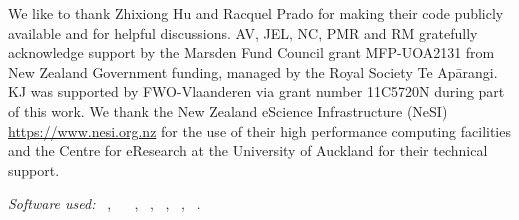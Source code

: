 \documentclass[%
 reprint,
 amsmath,amssymb,
 aps,
 nofootinbib,
]{revtex4-2}
\begin{document}
\begin{acknowledgments}
We like to thank Zhixiong Hu and Racquel Prado for making their code publicly available and for helpful discussions. AV,  JEL, NC, PMR and RM gratefully acknowledge support  by the Marsden Fund Council grant MFP-UOA2131 from New Zealand Government funding, managed by the Royal Society Te Apārangi. KJ was supported by FWO-Vlaanderen via grant number 11C5720N during part of this work.
We thank the New Zealand eScience Infrastructure
(NeSI) \url{https://www.nesi.org.nz} for the use of their high performance computing facilities and the Centre for eResearch at the University of Auckland for their technical
support.
\end{acknowledgments}


\vspace{3mm}

\noindent\textit{Software used:}
\python~\cite{python2020},
\tensorflowProb~\cite{tensorflow, tensorflowProb}
\numpy~\cite{numpy},
\scipy~\cite{scipy},
\pandas~\cite{pandas},
\matplotlib~\cite{matplotlib},
\jupyterbook~\cite{jupyterbook}.













\end{document}
